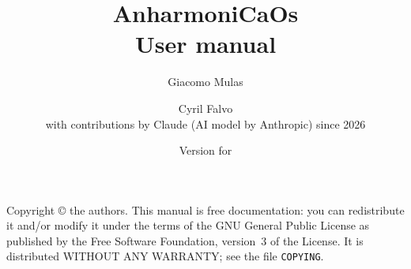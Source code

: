 \documentclass[11pt,a4paper]{report}
\title{AnharmoniCaOs\\[1ex]\large User manual}
\author{Giacomo Mulas \and Cyril Falvo\\[2ex]
  \small with contributions by Claude (AI model by Anthropic) since 2026}
\date{Version for \acversion}
\begin{document}
\maketitle

\begin{center}\small
Copyright \copyright{} the authors. This manual is free documentation: you
can redistribute it and/or modify it under the terms of the GNU General
Public License as published by the Free Software Foundation, version~3 of the
License. It is distributed
WITHOUT ANY WARRANTY; see the file \texttt{COPYING}.
\end{center}
\tableofcontents













\cleardoublepage
{}
{}
\renewcommand{\indexname}{Index of options}
\printindex
\end{document}
